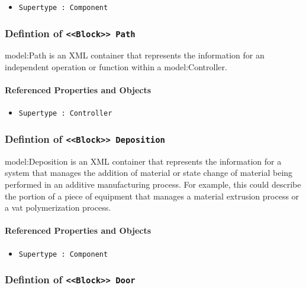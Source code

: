 \begin{itemize}
\item \texttt{Supertype : Component}

\end{itemize}
\FloatBarrier
\subsubsection{Defintion of \texttt{<<Block>> Path}}
  \label{type:Path}

\FloatBarrier

{model:Path} is an XML container that represents the information for an independent operation or function within a {model:Controller}.

\FloatBarrier
\paragraph{Referenced Properties and Objects}

\begin{itemize}
\item \texttt{Supertype : Controller}

\end{itemize}
\FloatBarrier
\subsubsection{Defintion of \texttt{<<Block>> Deposition}}
  \label{type:Deposition}

\FloatBarrier

{model:Deposition} is an XML container that represents the information for a system that manages the addition of material or state change of material being performed in an additive manufacturing process.  For example, this could describe the portion of a piece of equipment that manages a material extrusion process or a vat polymerization process.

\FloatBarrier
\paragraph{Referenced Properties and Objects}

\begin{itemize}
\item \texttt{Supertype : Component}

\end{itemize}
\FloatBarrier
\subsubsection{Defintion of \texttt{<<Block>> Door}}
  \label{type:Door}

